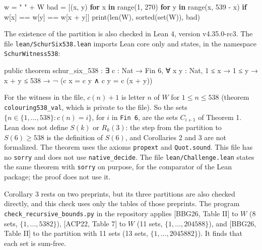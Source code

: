 \documentclass[
]{article}
\newenvironment{Shaded}{}{}
\newcommand{\BuiltInTok}[1]{\textcolor[rgb]{0.00,0.50,0.00}{#1}}
\newcommand{\ControlFlowTok}[1]{\textcolor[rgb]{0.00,0.44,0.13}{\textbf{#1}}}
\newcommand{\DecValTok}[1]{\textcolor[rgb]{0.25,0.63,0.44}{#1}}
\newcommand{\KeywordTok}[1]{\textcolor[rgb]{0.00,0.44,0.13}{\textbf{#1}}}
\newcommand{\NormalTok}[1]{#1}
\newcommand{\OperatorTok}[1]{\textcolor[rgb]{0.40,0.40,0.40}{#1}}
\newcommand{\StringTok}[1]{\textcolor[rgb]{0.25,0.44,0.63}{#1}}
\begin{document}
\begin{Shaded}
\begin{Highlighting}[]
\NormalTok{w }\OperatorTok{=} \StringTok{" "} \OperatorTok{+}\NormalTok{ W}
\NormalTok{bad }\OperatorTok{=}\NormalTok{ [(x, y) }\ControlFlowTok{for}\NormalTok{ x }\KeywordTok{in} \BuiltInTok{range}\NormalTok{(}\DecValTok{1}\NormalTok{, }\DecValTok{270}\NormalTok{) }\ControlFlowTok{for}\NormalTok{ y }\KeywordTok{in} \BuiltInTok{range}\NormalTok{(x, }\DecValTok{539} \OperatorTok{{-}}\NormalTok{ x)}
       \ControlFlowTok{if}\NormalTok{ w[x] }\OperatorTok{==}\NormalTok{ w[y] }\OperatorTok{==}\NormalTok{ w[x }\OperatorTok{+}\NormalTok{ y]]}
\BuiltInTok{print}\NormalTok{(}\BuiltInTok{len}\NormalTok{(W), }\BuiltInTok{sorted}\NormalTok{(}\BuiltInTok{set}\NormalTok{(W)), bad)}
\end{Highlighting}
\end{Shaded}

The existence of the partition is also checked in Lean 4, version
v4.35.0-rc3. The file \texttt{lean/SchurSix538.lean} imports Lean core
only and states, in the namespace \texttt{SchurWitness538}:

\begin{Shaded}
\begin{Highlighting}[]
\NormalTok{public theorem schur\_six\_538 :}
\NormalTok{    ∃ c : Nat → Fin 6, ∀ x y : Nat, 1 ≤ x → 1 ≤ y → x + y ≤ 538 →}
\NormalTok{      ¬ (c x = c y ∧ c y = c (x + y))}
\end{Highlighting}
\end{Shaded}

For the witness in the file, \(c(n)+1\) is letter \(n\) of \(W\) for
\(1\le n\le 538\) (theorem \texttt{colouring538\_val}, which is private
to the file). So the sets \(\{n\in\{1,\dots,538\}: c(n)=i\}\), for \(i\)
in \texttt{Fin\ 6}, are the sets \(C_{i+1}\) of Theorem 1. Lean does not
define \(S(k)\) or \(R_k(3)\): the step from the partition to
\(S(6)\ge 538\) is the definition of \(S(6)\), and Corollaries 2 and 3
are not formalized. The theorem uses the axioms \texttt{propext} and
\texttt{Quot.sound}. This file has no \texttt{sorry} and does not use
\texttt{native\_decide}. The file \texttt{lean/Challenge.lean} states
the same theorem with \texttt{sorry} on purpose, for the comparator of
the Lean package; the proof does not use it.

Corollary 3 rests on two preprints, but its three partitions are also
checked directly, and this check uses only the tables of those
preprints. The program \texttt{check\_recursive\_bounds.py} in the
repository applies {[}BBG26, Table II{]} to \(W\) (8 sets,
\(\{1,\dots,5382\}\)), {[}ACP22, Table 7{]} to \(W\) (11 sets,
\(\{1,\dots,204588\}\)), and {[}BBG26, Table II{]} to the partition with
11 sets (13 sets, \(\{1,\dots,2045882\}\)). It finds that each set is
sum-free.
\end{document}
